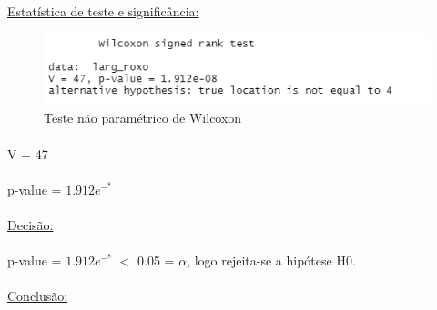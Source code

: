 \documentclass{article}
\begin{document}
\paragraph{} \underline{Estatística de teste e significância:}

\begin{figure}[h]
       \centering %
        \includegraphics[scale=0.8]{teste_de_hipotese_2a_hipotese.png} 
       \caption{Teste não paramétrico de Wilcoxon}
       \label{fig:logo}
    \end{figure}
    
\paragraph{} V = 47
\paragraph{} p-value = \begin{math}1.912e^-^8\end{math}
\paragraph{} \underline{Decisão:}
\paragraph{} p-value = \begin{math}1.912e^-^8\end{math} \begin{math}<\end{math} 0.05 = \begin{math}\alpha\end{math}, logo rejeita-se a hipótese H0.
\paragraph{}
\paragraph{}
\paragraph{}\underline{Conclusão:}
\end{document}
